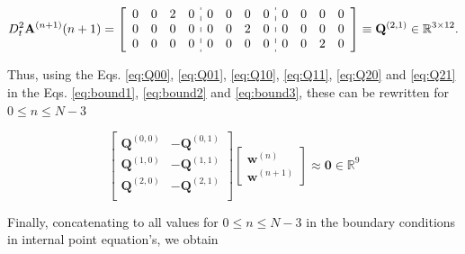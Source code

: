 \begin{equation}\label{eq:Q21}
D_{t}^{2} \mathbf{A}^{(n+1)}(n+1)
=
\left[
\begin{array}{cccc:cccc:cccc}
0 & 0 & 2 & 0 &
0 & 0 & 0 & 0 &
0 & 0 & 0 & 0 \\
0 & 0 & 0 & 0 &
0 & 0 & 2 & 0 &
0 & 0 & 0 & 0 \\
0 & 0 & 0 & 0 &
0 & 0 & 0 & 0 &
0 & 0 & 2 & 0 
\end{array}
\right]
\equiv \mathbf{Q}^{(2,1)}\in \mathbb{R}^{3\times 12}.
\end{equation}

Thus,
using the Eqs. \ref{eq:Q00}, \ref{eq:Q01}, \ref{eq:Q10}, \ref{eq:Q11}, \ref{eq:Q20} and \ref{eq:Q21} in 
the Eqs. \ref{eq:bound1}, \ref{eq:bound2} and \ref{eq:bound3}, 
these can be rewritten for $0 \leq n\leq N-3$

\begin{equation}
\begin{bmatrix}
\mathbf{Q}^{(0,0)} & -\mathbf{Q}^{(0,1)}\\
\mathbf{Q}^{(1,0)} & -\mathbf{Q}^{(1,1)}\\
\mathbf{Q}^{(2,0)} & -\mathbf{Q}^{(2,1)}\\
\end{bmatrix}
\begin{bmatrix}
\mathbf{w}^{(n)}\\
\mathbf{w}^{(n+1)}
\end{bmatrix}
\approx\mathbf{0}\in \mathbb{R}^{9}
\end{equation}

Finally, 
concatenating to all values for $0 \leq n\leq N-3$
in the boundary conditions in internal point equation's, we obtain

